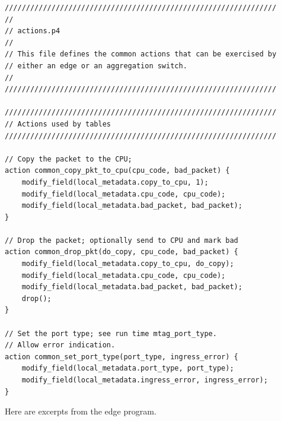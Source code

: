 \documentclass[12pt]{article}
\begin{document}
\begin{lstlisting}[keywords={},frame=single,escapechar=\@]
////////////////////////////////////////////////////////////////
//
// actions.p4
//
// This file defines the common actions that can be exercised by
// either an edge or an aggregation switch. 
//
////////////////////////////////////////////////////////////////

////////////////////////////////////////////////////////////////
// Actions used by tables
////////////////////////////////////////////////////////////////

// Copy the packet to the CPU;
action common_copy_pkt_to_cpu(cpu_code, bad_packet) {
    modify_field(local_metadata.copy_to_cpu, 1);
    modify_field(local_metadata.cpu_code, cpu_code);
    modify_field(local_metadata.bad_packet, bad_packet);
}

// Drop the packet; optionally send to CPU and mark bad
action common_drop_pkt(do_copy, cpu_code, bad_packet) {
    modify_field(local_metadata.copy_to_cpu, do_copy);
    modify_field(local_metadata.cpu_code, cpu_code);
    modify_field(local_metadata.bad_packet, bad_packet);
    drop();
}

// Set the port type; see run time mtag_port_type. 
// Allow error indication.
action common_set_port_type(port_type, ingress_error) {
    modify_field(local_metadata.port_type, port_type);
    modify_field(local_metadata.ingress_error, ingress_error);
}
\end{lstlisting}

Here are excerpts from the edge program.
\end{document}
